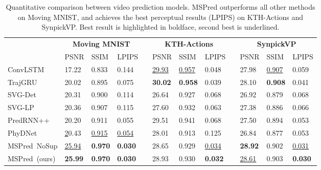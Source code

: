\documentclass{bmvc2k}
\begin{document}
\begin{table*}[t!]
	\centering
	\caption{Quantitative comparison between video prediction models. MSPred outperforms all other methods on Moving MNIST, and achieves the best perceptual results (LPIPS) on KTH-Actions and SynpickVP. Best result is highlighted in boldface, second best is underlined.}
	\label{table: comparison}
	\vspace{0.05cm}
	\small
	\begin{tabular}{p{1.98cm} p{0.64cm}p{0.63cm}p{0.63cm}r p{0.64cm}p{0.63cm}p{0.63cm}r  p{0.64cm}p{0.63cm}p{0.76cm}}
		\toprule
		&  \multicolumn{3}{c}{\textbf{Moving MNIST}} && \multicolumn{3}{c}{\textbf{KTH-Actions}} && \multicolumn{3}{c}{\textbf{SynpickVP}}\\
		
		\textbf{} & {PSNR} & {SSIM} & {LPIPS} && {PSNR} & {SSIM} & {LPIPS} && {PSNR} & {SSIM} & {LPIPS} \\
\midrule
ConvLSTM~\cite{Shi_ConvLSTMNetworkPrecipitationNowcasting_2015} & 17.22 & 0.833 & 0.144  &&  \underline{29.93} & \underline{0.957} & 0.048 && 27.98 & \underline{0.907} & 0.059	\\
TrajGRU~\cite{Shi_DeepLearningForPrecipitationNowcastingBenchamrkAndModel_2017} & 20.02 & 0.895 & 0.075	 && \textbf{30.02} & \textbf{0.958} & 0.039 && 28.10 & \textbf{0.908} & 0.041	\\
SVG-Det~\cite{Denton_StochasticVideoGenerationWithALearnedPrior_2018} & 20.31 & 0.900 & 0.114	 &&  26.64 & 0.927 & 0.068 && 26.92 & 0.879 & 0.068	\\
SVG-LP~\cite{Denton_StochasticVideoGenerationWithALearnedPrior_2018} & 20.36 & 0.907 & 0.115	 && 27.60 & 0.932 & 0.063 && 27.38 & 0.886 & 0.066	\\
PredRNN++~\cite{Wang_PredRNN_2021} & 20.20 & 0.911 & 0.055	 && 29.51 & 0.941 & 0.068 && 27.50 & 0.894 & 0.053	\\
PhyDNet~\cite{Guen_DisentanglingPhysiscalDynamicsFromUnknownFactorsForVideoPrediction_2020} & \underline20.43 & \underline{0.915} & \underline{0.054}	 && 28.01 & 0.913 & 0.125 && 26.84 & 0.877 & 0.053	\\
MSPred~NoSup & \underline{25.94} & \textbf{0.970} & \textbf{0.030} && 28.65 & 0.929 & \underline{0.034} && \textbf{28.92} & 0.902 & \underline{0.031}	\\
MSPred~(ours) & \textbf{25.99} & \textbf{0.970} & \textbf{0.030} && 28.93 & 0.930 & \textbf{0.032} && \underline{28.61} & 0.903 & \textbf{0.030}	\\
		\bottomrule
	\end{tabular}
	\vspace{-0.cm}
\end{table*}
\end{document}
